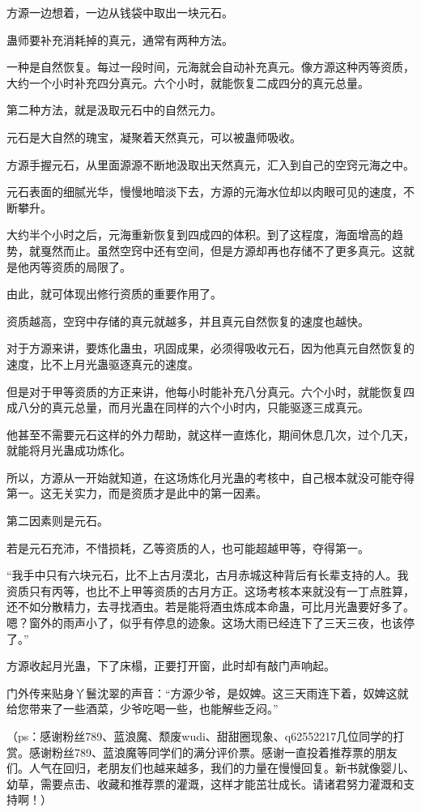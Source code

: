 \begin{this_body}
方源一边想着，一边从钱袋中取出一块元石。

蛊师要补充消耗掉的真元，通常有两种方法。

一种是自然恢复。每过一段时间，元海就会自动补充真元。像方源这种丙等资质，大约一个小时补充四分真元。六个小时，就能恢复二成四分的真元总量。

第二种方法，就是汲取元石中的自然元力。

元石是大自然的瑰宝，凝聚着天然真元，可以被蛊师吸收。

方源手握元石，从里面源源不断地汲取出天然真元，汇入到自己的空窍元海之中。

元石表面的细腻光华，慢慢地暗淡下去，方源的元海水位却以肉眼可见的速度，不断攀升。

大约半个小时之后，元海重新恢复到四成四的体积。到了这程度，海面增高的趋势，就戛然而止。虽然空窍中还有空间，但是方源却再也存储不了更多真元。这就是他丙等资质的局限了。

由此，就可体现出修行资质的重要作用了。

资质越高，空窍中存储的真元就越多，并且真元自然恢复的速度也越快。

对于方源来讲，要炼化蛊虫，巩固成果，必须得吸收元石，因为他真元自然恢复的速度，比不上月光蛊驱逐真元的速度。

但是对于甲等资质的方正来讲，他每小时能补充八分真元。六个小时，就能恢复四成八分的真元总量，而月光蛊在同样的六个小时内，只能驱逐三成真元。

他甚至不需要元石这样的外力帮助，就这样一直炼化，期间休息几次，过个几天，就能将月光蛊成功炼化。

所以，方源从一开始就知道，在这场炼化月光蛊的考核中，自己根本就没可能夺得第一。这无关实力，而是资质才是此中的第一因素。

第二因素则是元石。

若是元石充沛，不惜损耗，乙等资质的人，也可能超越甲等，夺得第一。

“我手中只有六块元石，比不上古月漠北，古月赤城这种背后有长辈支持的人。我资质只有丙等，也比不上甲等资质的古月方正。这场考核本来就没有一丁点胜算，还不如分散精力，去寻找酒虫。若是能将酒虫炼成本命蛊，可比月光蛊要好多了。嗯？窗外的雨声小了，似乎有停息的迹象。这场大雨已经连下了三天三夜，也该停了。”

方源收起月光蛊，下了床榻，正要打开窗，此时却有敲门声响起。

门外传来贴身丫鬟沈翠的声音：“方源少爷，是奴婢。这三天雨连下着，奴婢这就给您带来了一些酒菜，少爷吃喝一些，也能解些乏闷。”

（ps：感谢粉丝789、蓝浪魔、颓废wudi、甜甜圈现象、q62552217几位同学的打赏。感谢粉丝789、蓝浪魔等同学们的满分评价票。感谢一直投着推荐票的朋友们。人气在回归，老朋友们也越来越多，我们的力量在慢慢回复。新书就像婴儿、幼草，需要点击、收藏和推荐票的灌溉，这样才能茁壮成长。请诸君努力灌溉和支持啊！）

\end{this_body}

